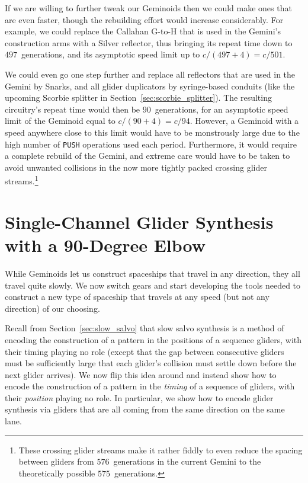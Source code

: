 If we are willing to further tweak our Geminoids then we could make ones that are even faster, though the rebuilding effort would increase considerably. For example, we could replace the Callahan G-to-H that is used in the Gemini's construction arms with a Silver reflector, thus bringing its repeat time down to $497$~generations, and its asymptotic speed limit up to $c/(497+4) = c/501$.

We could even go one step further and replace all reflectors that are used in the Gemini by Snarks, and all glider duplicators by syringe-based conduits (like the upcoming Scorbie splitter in Section~\ref{sec:scorbie_splitter}). The resulting circuitry's repeat time would then be $90$~generations, for an asymptotic speed limit of the Geminoid equal to $c/(90+4) = c/94$. However, a Geminoid with a speed anywhere close to this limit would have to be monstrously large due to the high number of \texttt{PUSH} operations used each period. Furthermore, it would require a complete rebuild of the Gemini, and extreme care would have to be taken to avoid unwanted collisions in the now more tightly packed crossing glider streams.\footnote{These crossing glider streams make it rather fiddly to even reduce the spacing between gliders from $576$~generations in the current Gemini to the theoretically possible $575$~generations.}


\section{Single-Channel Glider Synthesis with a 90-Degree Elbow}\label{sec:single_channel_synth}

While Geminoids let us construct spaceships that travel in any direction, they all travel quite slowly. We now switch gears and start developing the tools needed to construct a new type of spaceship that travels at any speed (but not any direction) of our choosing.

Recall from Section~\ref{sec:slow_salvo} that slow salvo synthesis is a method of encoding the construction of a pattern in the positions of a sequence gliders, with their timing playing no role (except that the gap between consecutive gliders must be sufficiently large that each glider's collision must settle down before the next glider arrives). We now flip this idea around and instead show how to encode the construction of a pattern in the \emph{timing} of a sequence of gliders, with their \emph{position} playing no role. In particular, we show how to encode glider synthesis via gliders that are all coming from the same direction on the same lane.


